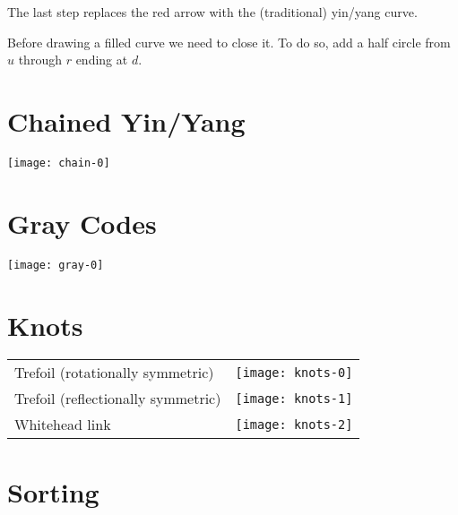 \documentclass{article}
\begin{document}
The last step replaces the red arrow with the (traditional) yin/yang curve.

Before drawing a filled curve we need to close it.
To do so, add a half circle from $u$ through $r$ ending at $d$.

\section{Chained Yin/Yang}
\begin{center}
\texttt{[image: chain-0]}
\end{center}

\section{Gray Codes}
\texttt{[image: gray-0]}

\section{Knots}
\begin{tabular}{lc}
Trefoil (rotationally symmetric)   & \texttt{[image: knots-0]} \\
Trefoil (reflectionally symmetric) & \texttt{[image: knots-1]} \\
Whitehead link                     & \texttt{[image: knots-2]} \\
\end{tabular}

\section{Sorting}
\end{document}
